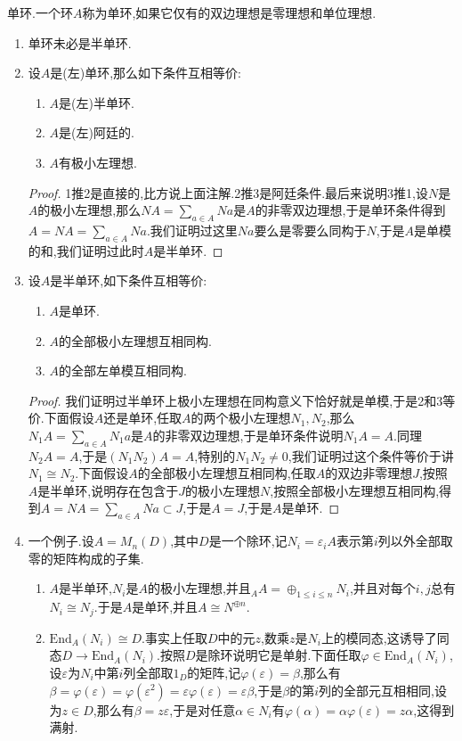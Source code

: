 单环.一个环$A$称为单环,如果它仅有的双边理想是零理想和单位理想.
\begin{enumerate}
	\item 单环未必是半单环.
	\item 设$A$是(左)单环,那么如下条件互相等价:
	\begin{enumerate}
		\item $A$是(左)半单环.
		\item $A$是(左)阿廷的.
		\item $A$有极小左理想.
	\end{enumerate}
	\begin{proof}
		
		1推2是直接的,比方说上面注解.2推3是阿廷条件.最后来说明3推1,设$N$是$A$的极小左理想,那么$NA=\sum_{a\in A}Na$是$A$的非零双边理想,于是单环条件得到$A=NA=\sum_{a\in A}Na$.我们证明过这里$Na$要么是零要么同构于$N$,于是$A$是单模的和,我们证明过此时$A$是半单环.
	\end{proof}
	\item 设$A$是半单环,如下条件互相等价:
	\begin{enumerate}
		\item $A$是单环.
		\item $A$的全部极小左理想互相同构.
		\item $A$的全部左单模互相同构.
	\end{enumerate}
	\begin{proof}
		
		我们证明过半单环上极小左理想在同构意义下恰好就是单模,于是2和3等价.下面假设$A$还是单环,任取$A$的两个极小左理想$N_1,N_2$,那么$N_1A=\sum_{a\in A}N_1a$是$A$的非零双边理想,于是单环条件说明$N_1A=A$.同理$N_2A=A$,于是$(N_1N_2)A=A$,特别的$N_1N_2\not=0$,我们证明过这个条件等价于讲$N_1\cong N_2$.下面假设$A$的全部极小左理想互相同构,任取$A$的双边非零理想$J$,按照$A$是半单环,说明存在包含于$J$的极小左理想$N$,按照全部极小左理想互相同构,得到$A=NA=\sum_{a\in A}Na\subset J$,于是$A=J$,于是$A$是单环.
	\end{proof}
	\item 一个例子.设$A=M_n(D)$,其中$D$是一个除环,记$N_i=\varepsilon_{i}A$表示第$i$列以外全部取零的矩阵构成的子集.
	\begin{enumerate}
		\item $A$是半单环,$N_i$是$A$的极小左理想,并且$_AA=\oplus_{1\le i\le n}N_i$,并且对每个$i,j$总有$N_i\cong N_j$.于是$A$是单环,并且$A\cong N^{\oplus n}$.
		\item $\mathrm{End}_A(N_i)\cong D$.事实上任取$D$中的元$z$,数乘$z$是$N_i$上的模同态,这诱导了同态$D\to\mathrm{End}_A(N_i)$.按照$D$是除环说明它是单射.下面任取$\varphi\in\mathrm{End}_A(N_i)$,设$\varepsilon$为$N_i$中第$i$列全部取$1_D$的矩阵,记$\varphi(\varepsilon)=\beta$,那么有$\beta=\varphi(\varepsilon)=\varphi(\varepsilon^2)=\varepsilon\varphi(\varepsilon)=\varepsilon\beta$,于是$\beta$的第$i$列的全部元互相相同,设为$z\in D$,那么有$\beta=z\varepsilon$,于是对任意$\alpha\in N_i$有$\varphi(\alpha)=\alpha\varphi(\varepsilon)=z\alpha$,这得到满射.
	\end{enumerate}
\end{enumerate}

